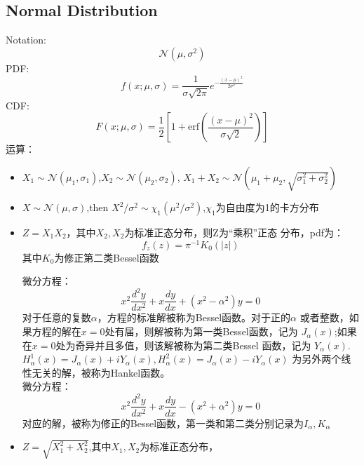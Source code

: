 \documentclass[fontset=none,oneside]{book}
\begin{document}
\subsection{Normal Distribution}
\noindent Notation:
\begin{equation}
\label{eq:23}
\mathcal{N}(\mu,\sigma^{2}) 
\end{equation}
PDF:
\begin{equation}
\label{eq:21}
f(x;\mu,\sigma)=\frac{1}{\sigma\sqrt{2\pi}}e^{-\frac{(x-\mu)^{2}}{2\sigma^{2}}}
\end{equation}
CDF:
\begin{equation}
\label{eq:22}
F(x;\mu,\sigma)=\frac{1}{2}[1+\mathrm{erf}(\frac{(x-\mu)^{2}}{\sigma\sqrt{2}})]
\end{equation}
运算：
\begin{itemize}
\item $X_{1} \sim
  \mathcal{N}(\mu_{1},\sigma_{1})$,$X_{2}\sim\mathcal{N}(\mu_{2},\sigma_{2})$,
$X_{1}+X_{2} \sim
\mathcal{N}(\mu_{1}+\mu_{2},\sqrt{\sigma_{1}^{2}+\sigma_{2}^{2}})$
\item $X\sim\mathcal{N}(\mu,\sigma)$,then $X^{2}/\sigma^{2}\sim
  \chi_{1}(\mu^{2}/\sigma^{2})$,$\chi_{1}$为自由度为1的卡方分布
\item $Z=X_{1}X_{2}$，其中$X_{2},X_{2}$为标准正态分布，则Z为“乘积”正态
  分布，pdf为：
\begin{equation}
\label{eq:24}
f_{z}(z)=\pi^{-1}K_{0}(|z|)
\end{equation}
其中$K_{0}$为修正第二类Bessel函数
\begin{shaded}
微分方程：
\begin{equation}
\label{eq:39}
x^{2}\frac{d^{2}y}{dx^{2}}+x\frac{dy}{dx}+(x^{2}-\alpha^{2})y=0
\end{equation}
对于任意的复数$\alpha$，方程的标准解被称为Bessel函数。对于正的$\alpha$
或者整数，如果方程的解在$x=0$处有届，则解被称为第一类Bessel函数，记为
$J_{\alpha}(x)$;如果在$x=0$处为奇异并且多值，则该解被称为第二类Bessel
函数，记为
$Y_{\alpha}(x)$. $H_{\alpha}^{1}(x)=J_{\alpha}(x)+iY_{\alpha}(x),H_{\alpha}^{2}(x)=J_{\alpha}(x)-iY_{\alpha}(x)$
为另外两个线性无关的解，被称为Hankel函数。\\
微分方程：
\begin{equation}
\label{eq:40}
x^{2}\frac{d^{2}y}{dx^{2}}+x\frac{dy}{dx}-(x^{2}+\alpha^{2})y=0
\end{equation}
对应的解，被称为修正的Bessel函数，第一类和第二类分别记录为$I_{\alpha},K_{\alpha}$
\end{shaded}
\item $Z=\sqrt{X_{1}^{2}+X_{2}^{2}}$,其中$X_{1},X_{2}$为标准正态分布，

\end{itemize}
\end{document}
